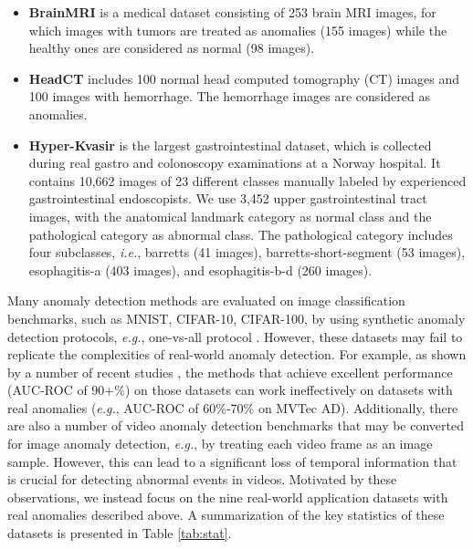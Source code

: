 \documentclass[10pt,journal,compsoc]{IEEEtran}
\newcommand{\eg}{\textit{e.g.}}
\newcommand{\ie}{\textit{i.e.}}
\begin{document}
\begin{itemize}
    \item \textbf{BrainMRI} \cite{salehi2021multiresolution} is a medical dataset consisting of 253 brain MRI images, for which images with tumors are treated as anomalies (155 images) while the healthy ones are considered as normal (98 images). 

    \item \textbf{HeadCT} \cite{salehi2021multiresolution}
includes 100 normal head computed tomography (CT) images and 100 images with hemorrhage. The hemorrhage images are considered as anomalies.

    \item \textbf{Hyper-Kvasir} \cite{borgli2020hyperkvasir} is the largest gastrointestinal dataset, which is collected during real gastro and colonoscopy examinations at a Norway hospital. It contains 10,662 images of 23 different classes manually labeled by experienced gastrointestinal endoscopists. We use 3,452 upper gastrointestinal tract images,
    with the anatomical landmark category as normal class and the pathological category as abnormal class. The pathological category includes four subclasses, \ie, barretts (41 images), barretts-short-segment (53 images), esophagitis-a (403 images), and esophagitis-b-d (260 images).
    
\end{itemize}


Many anomaly detection methods are evaluated on image classification benchmarks, such as MNIST, CIFAR-10, CIFAR-100, by using synthetic anomaly detection protocols, \eg, one-vs-all protocol \cite{ruff2018deepsvdd}. However, these datasets may fail to replicate the complexities of real-world anomaly detection. For example, as shown by a number of recent studies \cite{bergmann2020uninformed,yi2020patch,salehi2021multiresolution}, the methods that achieve excellent performance (AUC-ROC of 90+\%) on those datasets can work ineffectively on datasets with real anomalies (\eg, AUC-ROC of 60\%-70\% on MVTec AD). Additionally, there are also a number of video anomaly detection benchmarks that may be converted for image anomaly detection, \eg, by treating each video frame as an image sample. However, this can lead to a significant loss of temporal information that is crucial for detecting abnormal events in videos. Motivated by these observations, we instead focus on the nine real-world application datasets with real anomalies described above. A summarization of the key statistics of these datasets is presented in Table \ref{tab:stat}.
\end{document}
